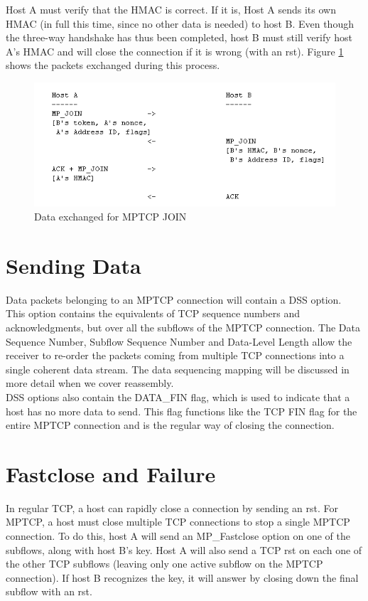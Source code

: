 Host A must verify that the HMAC is correct. If it is, Host A sends its own HMAC (in full this time, since no other data is needed) to host B. Even though the three-way handshake has thus been completed, host B must still verify host A's HMAC and will close the connection if it is wrong (with an rst). Figure  \ref{pic:mpjoinex} shows the packets exchanged during this process.

\begin{figure}[!t]
\centering
\includegraphics[scale= 0.6]{Figures/mpjoinex.png}
\caption{Data exchanged for MPTCP JOIN}
\label{pic:mpjoinex}
\end{figure}

\section{Sending Data}
Data packets belonging to an MPTCP connection will contain a DSS option. This option contains the equivalents of TCP sequence numbers and acknowledgments, but over all the subflows of the MPTCP connection. The Data Sequence Number, Subflow Sequence Number and Data-Level Length allow the receiver to re-order the packets coming from multiple TCP connections into a single coherent data stream. The data sequencing mapping will be discussed in more detail when we cover reassembly. \\

DSS options also contain the DATA\_FIN flag, which is used to indicate that a host has no more data to send. This flag functions like the TCP FIN flag for the entire MPTCP connection and is the regular way of closing the connection.

\section{Fastclose and Failure}
In regular TCP, a host can rapidly close a connection by sending an rst. For MPTCP, a host must close multiple TCP connections to stop a single MPTCP connection. To do this, host A will send an MP\_Fastclose option on one of the subflows, along with host B's key. Host A will also send a TCP rst on each one of the other TCP subflows (leaving only one active subflow on the MPTCP connection). If host B recognizes the key, it will answer by closing down the final subflow with an rst. \\

